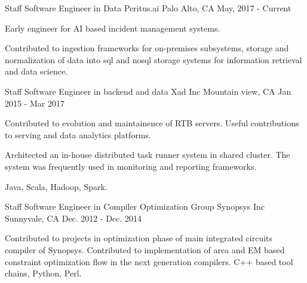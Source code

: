

\begin{cventries}
  \cventry
    {Staff Software Engineer in Data } %
    {Peritus.ai} %
    {Palo Alto, CA} %
    {May, 2017 - Current} %
    {
      \begin{cvitems} %
        \item {Early engineer for AI based incident management systems.}
        \item {Contributed to ingestion frameworks for on-premises subsystems, storage and normalization of data into sql and nosql storage systems for information retrieval and data science.}
      \end{cvitems}
    }


  \cventry
    {Staff Software Engineer in backend and data} %
    {Xad Inc} %
    {Mountain view, CA} %
    {Jan 2015 - Mar 2017} %
    {
      \begin{cvitems} %
        \item {Contributed to evolution and maintainence of  RTB servers. Useful contributions to serving and data analytics platforms.} 
        \item {Architected an in-house distributed task runner system in shared cluster. The system was frequently used in monitoring and reporting frameworks.}
        \item {Java, Scala, Hadoop, Spark.}
      \end{cvitems}
    }

  \cventry
    {Staff Software Engineer in Compiler Optimization Group} %
    {Synopsys Inc} %
    {Sunnyvale, CA} %
    {Dec. 2012 - Dec. 2014} %
    {
      \begin{cvitems} %
        \item {Contributed to projects in optimization phase of main integrated circuits compiler of Synopsys. Contributed to implementation of area and EM based constraint optimization flow in the next generation compilers.
	 C++ based tool chains, Python, Perl.}
      \end{cvitems}
    }


\end{cventries}
